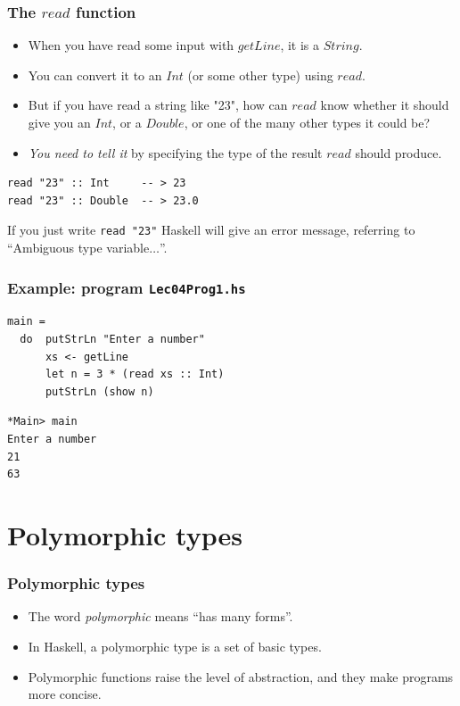 \documentclass{beamer}
\begin{document}
\begin{frame}[fragile]
\frametitle{The $read$ function}

\begin{itemize}
\item When you have read some input with $getLine$, it is a
  $String$.
\item You can convert it to an $Int$ (or some other type) using
  $read$.
\item But if you have read a string like "23", how can $read$ know
  whether it should give you an $Int$, or a $Double$, or one of the
  many other types it could be?
\item \emph{You need to tell it} by specifying the type of the
  result $read$ should produce.
\end{itemize}

\begin{verbatim}
read "23" :: Int     -- > 23
read "23" :: Double  -- > 23.0
\end{verbatim}

If you just write {\tt read "23"} Haskell will give an error message,
referring to ``Ambiguous type variable$\ldots$''.

\end{frame}

\begin{frame}[fragile]
\frametitle{Example: program \tt{Lec04Prog1.hs}}

\begin{verbatim}
main =
  do  putStrLn "Enter a number"
      xs <- getLine
      let n = 3 * (read xs :: Int)
      putStrLn (show n)
\end{verbatim}

\begin{verbatim}
*Main> main
Enter a number
21
63
\end{verbatim}

\end{frame}

\section{Polymorphic types}

\begin{frame}[fragile]
\frametitle{Polymorphic types}

\begin{itemize}
\item The word \emph{polymorphic} means ``has many forms''.
\item In Haskell, a polymorphic type is a set of basic types.
\item Polymorphic functions raise the level of abstraction, and
  they make programs more concise.
\end{itemize}

\end{frame}
\end{document}
